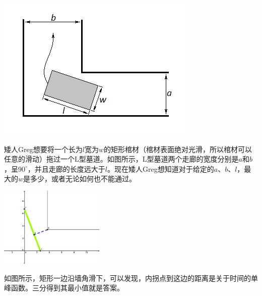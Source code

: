 \begin{prob}
	{\centering
	\includegraphics[scale=0.75]{98C.png} } 
	\par
	矮人Greg想要将一个长为$l$宽为$w$的矩形棺材（棺材表面绝对光滑，所以棺材可以任意的滑动）拖过一个L型墓道。如图所示，L型墓道两个走廊的宽度分别是$a$和$b$，呈$90^\circ$，并且走廊的长度远大于$l$。现在矮人Greg想知道对于给定的$a$、$b$、$l$，最大的$w$是多少，或者无论如何也不能通过。

\end{prob}

\begin{sol}
	\begin{center}
		\includegraphics[width=5cm]{98C.eps} 
	\end{center}
	\par
		如图所示，矩形一边沿墙角滑下，可以发现，内拐点到这边的距离是关于时间的单峰函数。三分得到其最小值就是答案。
\end{sol}
